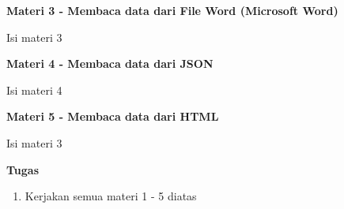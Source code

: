 \documentclass{article}
\begin{document}
    \begin{flushleft}
        \textbf{Materi 3 - Membaca data dari File Word (Microsoft Word)}
        \newline

        Isi materi 3
    \end{flushleft}

    \begin{flushleft}
        \textbf{Materi 4 - Membaca data dari JSON}
        \newline

        Isi materi 4
    \end{flushleft}

    \begin{flushleft}
        \textbf{Materi 5 - Membaca data dari HTML}
        \newline

        Isi materi 3
    \end{flushleft}

    \newpage
    \begin{flushleft}
        \textbf{Tugas}
        \newline

        \begin{enumerate}
            \item Kerjakan semua materi 1 - 5 diatas
        \end{enumerate}
    \end{flushleft}
\end{document}
